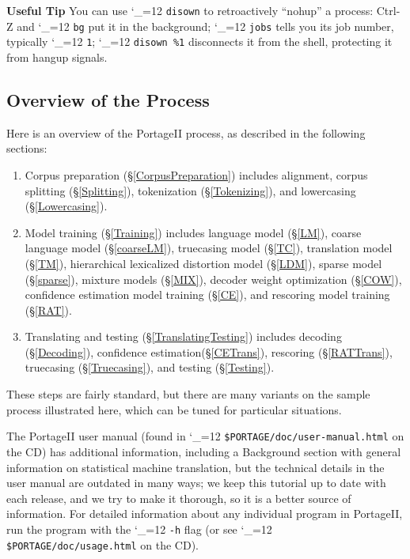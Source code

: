 \documentclass[11pt,letterpaper]{article}
\newcommand{\TODO}[1]{\emph{\textbf{\textcolor{red}{<TODO> #1 </TODO>}}}}
\newcommand{\PS}{PortageII\xspace}
\def\code{\begingroup\catcode`\_=12 \codex}
\newcommand{\codex}[1]{\texttt{#1}\endgroup}
\newcommand{\tip}{\textbf{Useful Tip \large{\ding{43}} }}
\newcommand{\margintip}{\marginpar[{\textbf{Tip \large{\ding{43}}}}]{\textbf{\reflectbox{\large{\ding{43}}} Tip}}}
\newcommand{\tipend}{\textbf{ \reflectbox{\large{\ding{43}}}}}
\begin{document}
\tip\margintip You can use \code{disown} to retroactively ``nohup'' a process:
Ctrl-Z and \code{bg} put it in the background; \code{jobs} tells you its job
number, typically \code{1}; \code{disown \%1} disconnects it from the shell,
protecting it from hangup signals.\tipend

\subsection{Overview of the Process}


Here is an overview of the \PS process, as described in the following
sections:
\begin{enumerate}
\item Corpus preparation (\S\ref{CorpusPreparation}) includes
      alignment,
      corpus splitting (\S\ref{Splitting}),
      tokenization (\S\ref{Tokenizing}),
      and
      lowercasing (\S\ref{Lowercasing}).
\item Model training (\S\ref{Training}) includes
      language model (\S\ref{LM}),
      coarse language model (\S\ref{coarseLM}),
      truecasing model (\S\ref{TC}),
      translation model (\S\ref{TM}),
      hierarchical lexicalized distortion model (\S\ref{LDM}),
      sparse model (\S\ref{sparse}),
      mixture models (\S\ref{MIX}),
      decoder weight optimization (\S\ref{COW}),
      confidence estimation model training (\S\ref{CE}),
      and
      rescoring model training (\S\ref{RAT}).
\item Translating and testing (\S\ref{TranslatingTesting}) includes
      decoding (\S\ref{Decoding}),
      confidence estimation(\S\ref{CETrans}),
      rescoring (\S\ref{RATTrans}),
      truecasing (\S\ref{Truecasing}),
      and
      testing (\S\ref{Testing}).
\end{enumerate}
These steps are fairly standard, but there are many variants on the
sample process illustrated here, which can be tuned for particular situations.

The \PS user manual (found in \code{\$PORTAGE/doc/user-manual.html} on the CD)
has additional information, including a Background section with general
information on statistical machine translation, but the technical details in
the user manual are outdated in many ways; we keep this tutorial up to date
with each release, and we try to make it thorough, so it is a better source of
information.  For detailed information about any individual program in \PS, run
the program with the \code{-h} flag (or see \code{\$PORTAGE/doc/usage.html} on
the CD).
\end{document}

